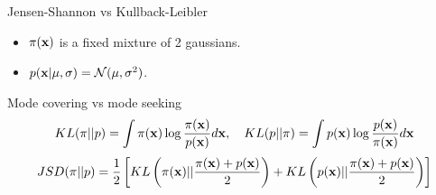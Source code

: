 \begin{frame}{Jensen-Shannon vs Kullback-Leibler }
	\begin{itemize}
		\item $\pi(\mathbf{x})$ is a fixed mixture of 2 gaussians.
		\item $p(\mathbf{x} | \mu, \sigma) = \mathcal{N}(\mu, \sigma^2)$.
	\end{itemize}
	\begin{block}{Mode covering vs mode seeking}
		\vspace{-0.7cm}
		\[
		KL(\pi || p) = \int \pi(\mathbf{x}) \log \frac{\pi(\mathbf{x})}{p(\mathbf{x})}d\mathbf{x}, \quad KL(p || \pi) = \int p(\mathbf{x}) \log \frac{p(\mathbf{x})}{\pi(\mathbf{x})}d\mathbf{x}
		\]
		\[
		JSD(\pi || p) = \frac{1}{2} \left[KL \left(\pi(\mathbf{x}) || \frac{\pi(\mathbf{x}) + p(\mathbf{x})}{2}\right) + KL \left(p(\mathbf{x}) || \frac{\pi(\mathbf{x}) + p(\mathbf{x})}{2}\right) \right]
		\]
		\vspace{-0.7cm}
		

\end{block}
\end{frame}
